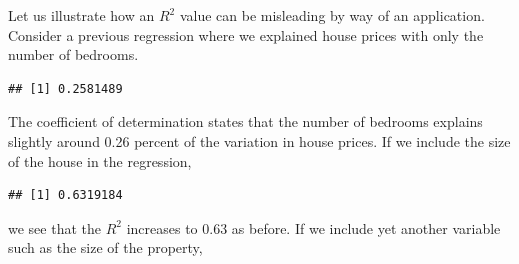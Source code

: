 \documentclass[
]{book}
\newenvironment{Shaded}{\begin{snugshade}}{\end{snugshade}}
\newcommand{\AttributeTok}[1]{\textcolor[rgb]{0.13,0.29,0.53}{#1}}
\newcommand{\FunctionTok}[1]{\textcolor[rgb]{0.13,0.29,0.53}{\textbf{#1}}}
\newcommand{\NormalTok}[1]{#1}
\newcommand{\OtherTok}[1]{\textcolor[rgb]{0.56,0.35,0.01}{#1}}
\newcommand{\SpecialCharTok}[1]{\textcolor[rgb]{0.81,0.36,0.00}{\textbf{#1}}}
\begin{document}
Let us illustrate how an \(R^2\) value can be misleading by way of an application. Consider a previous regression where we explained house prices with only the number of bedrooms.

\begin{Shaded}
\end{Shaded}

\begin{verbatim}
## [1] 0.2581489
\end{verbatim}

The coefficient of determination states that the number of bedrooms explains slightly around 0.26 percent of the variation in house prices. If we include the size of the house in the regression,

\begin{Shaded}
\end{Shaded}

\begin{verbatim}
## [1] 0.6319184
\end{verbatim}

we see that the \(R^2\) increases to 0.63 as before. If we include yet another variable such as the size of the property,

\begin{Shaded}
\end{Shaded}
\end{document}
